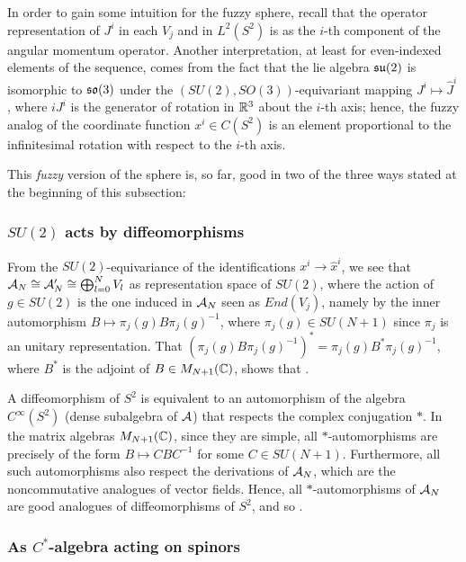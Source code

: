 In order to gain some intuition for the fuzzy sphere, recall that the operator representation of $J^i$ in each $V_j$ and in $L^2(S^2)$ is as the $i$-th component of the angular momentum operator. Another interpretation, at least for even-indexed elements of the sequence, comes from the fact that the lie algebra $\mathfrak{su}(2)$ is isomorphic to $\mathfrak{so}(3)$ under the $(SU(2), SO(3))$-equivariant mapping $J^i \mapsto \hat J^i$, where $iJ^i$ is the generator of rotation in $\mathbb{R}^3$ about the $i$-th axis; hence, the fuzzy analog of the coordinate function $x^i \in C(S^2)$ is an element proportional to the infinitesimal rotation with respect to the $i$-th axis. 

\lin

This \textit{fuzzy} version of the sphere is, so far, good in two of the three ways stated at the beginning of this subsection:

\subsubsection{$SU(2)$ acts by diffeomorphisms}

From the $SU(2)$-equivariance of the identifications $x^i \to \hat x^i$, we see that $\mathcal A_N \cong \mathcal A'_N \cong \bigoplus_{l=0}^N V_l$ as representation space of $SU(2)$, where the action of $g \in SU(2)$ is the one induced in $\mathcal A_N$ seen as $End(V_j)$, namely by the inner automorphism $B  \mapsto \pi_j(g)B \pi_j(g)^{-1}$, where $\pi_j(g) \in SU(N+1)$ since $\pi_j$ is an unitary representation. That $(\pi_j(g)B \pi_j(g)^{-1})^* = \pi_j(g)B^* \pi_j(g)^{-1}$, where $B^*$ is the adjoint of $B \in M_{N+1}(\mathbb{C})$, shows that .

A diffeomorphism of $S^2$ is equivalent to an automorphism of the algebra $C^\infty(S^2)$ (dense subalgebra of $\mathcal A$) that respects the complex conjugation $*$. In the matrix algebras $M_{N+1}(\mathbb{C})$, since they are simple, all $*$-automorphisms are precisely of the form $B \mapsto C B C^{-1}$ for some $C \in SU(N+1)$. Furthermore, all such automorphisms also respect the derivations of $\mathcal A_N$, which are the noncommutative analogues of vector fields. Hence, all $*$-automorphisms of $\mathcal A_N$ are good analogues of diffeomorphisms of $S^2$, and so .

\subsubsection{As $C^*$-algebra acting on spinors}

